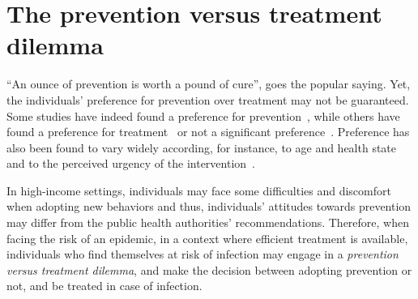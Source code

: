 %
%
%
%

\section{The prevention versus treatment dilemma}
\label{Intro:Dilemma}

``An ounce of prevention is worth a pound of cure'', goes the popular saying. Yet, the individuals' preference for prevention over treatment may not be guaranteed. Some studies have indeed found a preference for prevention~\cite[]{Bosworth2010,Mortimer2008}, while others have found a preference for treatment~\cite[]{Corso2002,Schwappach2002} or not a significant preference~\cite[]{Ubel1998}. Preference has also been found to vary widely according, for instance, to age and health state~\cite[]{Luyten2015} and to the perceived urgency of the intervention~\cite[]{Meertens2013}. 

In high-income settings, individuals may face some difficulties and discomfort when adopting new behaviors and thus, individuals' attitudes towards prevention may differ from the public health authorities' recommendations. Therefore, when facing the risk of an epidemic, in a context where efficient treatment is available, individuals who find themselves at risk of infection may engage in a \textit{prevention versus treatment dilemma}, and make the decision between adopting prevention or not, and be treated in case of infection. 

